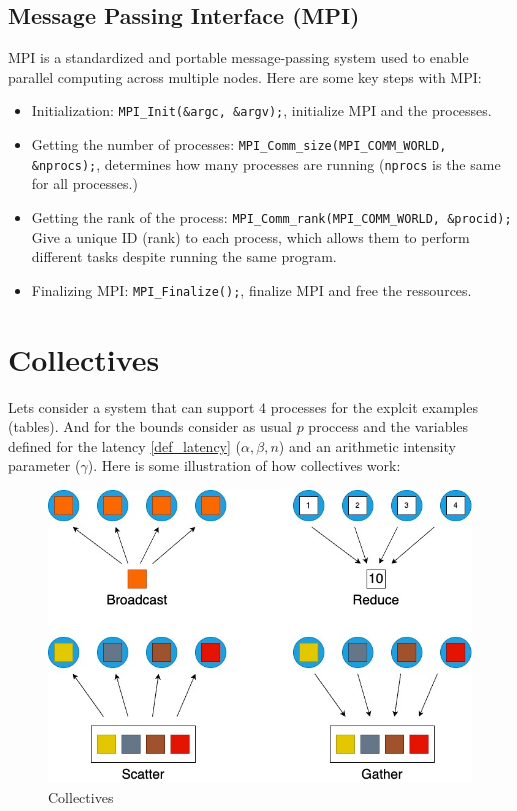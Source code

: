 \documentclass[12pt, openany]{report}
\theoremstyle{definition}
\newcommand{\code}[1]{\colorbox{light-gray}{\texttt{#1}}}
\begin{document}
\subsection{Message Passing Interface (MPI)}
MPI is a standardized and portable message-passing system used to enable parallel computing across multiple nodes.
Here are some key steps with MPI:
\begin{itemize}
	\item Initialization: \code{MPI\_Init(\&argc, \&argv);}, initialize MPI and the processes.
	\item Getting the number of processes: \code{MPI\_Comm\_size(MPI\_COMM\_WORLD, \&nprocs);}, determines how many processes are running (\code{nprocs} is the same for all processes.)
	\item Getting the rank of the process: \code{MPI\_Comm\_rank(MPI\_COMM\_WORLD, \&procid);} Give a unique ID (rank) to each process, which allows them to perform different tasks despite running the same program.
	\item Finalizing MPI:  \code{MPI\_Finalize();}, finalize MPI and free the ressources.
\end{itemize}
\newpage
\section{Collectives}
Lets consider a system that can support $4$ processes for the explcit examples (tables). And for the bounds consider as usual $p$ proccess and the variables defined for the latency \ref{def_latency} ($\alpha,\beta,n$) and an arithmetic intensity parameter ($\gamma$). Here is some illustration of how collectives work:
\begin{figure}[H]
	\centering
	\includegraphics[scale=0.5]{img/collectives.jpeg}
	\caption{Collectives}
	\label{fig:collectives}
\end{figure}
\end{document}

